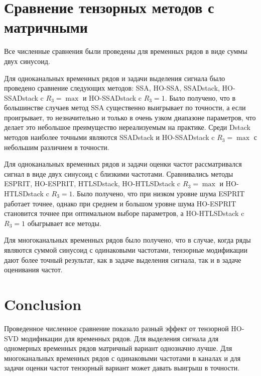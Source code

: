 \documentclass[12pt]{article}
\theoremstyle{definition}
\theoremstyle{remark}
\begin{document}
\section{Сравнение тензорных методов с матричными}
Все численные сравнения были проведены для временных рядов в виде
суммы двух синусоид.

Для одноканальных временных рядов и задачи выделения сигнала было
проведено сравнение следующих методов:
SSA, HO-SSA, SSADstack, HO-SSADstack c $R_3=\max$ и HO-SSADstack c
$R_3=1$. Было получено, что в большинстве случаев метод SSA
существенно выигрывает по точности, а если проигрывает, то
незначительно и только в очень узком диапазоне параметров, что делает
это небольшое преимущество нереализуемым на практике.
Среди Dstack методов наиболее точными являются SSADstack и
HO-SSADstack c $R_3=\max$
с небольшим различием в точности.

Для одноканальных временных рядов и задачи оценки частот рассматривался
сигнал в виде двух синусоид с близкими частотами. Сравнивались методы
ESPRIT, HO-ESPRIT, HTLSDstack, HO-HTLSDstack c $R_3=\max$ и
HO-HTLSDstack c $R_3=1$. Было получено, что при низком уровне шума
ESPRIT работает точнее, однако при среднем и большом уровне шума
HO-ESPRIT становится точнее при оптимальном выборе параметров, а
HO-HTLSDstack c $R_3=1$ обыгрывает все методы.

Для многоканальных временных рядов было получено, что в случае, когда
ряды являются суммой синусоид с одинаковыми частотами, тензорные
модификации дают  более точный результат, как в задаче выделения
сигнала, так и в задаче оценивания частот.

\section{Conclusion}
Проведенное численное сравнение показало разный эффект от тензорной
HO-SVD модификации для временных рядов.
Для выделения сигнала для одномерных временных рядов матричный
вариант однозначно лучше.
Для многоканальных временных рядов с одинаковыми частотами в каналах
и для задачи оценки частот тензорный вариант может давать выигрыш в точности.

\end{document}

